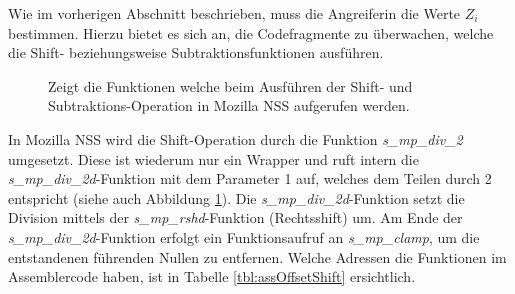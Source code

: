 Wie im vorherigen Abschnitt beschrieben, muss die Angreiferin die Werte $Z_i$ bestimmen.
Hierzu bietet es sich an, die Codefragmente zu überwachen, welche die Shift- beziehungsweise Subtraktionsfunktionen ausführen.

\begin{figure}[h]
\centering
\begin{scaletikzpicturetowidth}{\textwidth}
\end{scaletikzpicturetowidth}
\caption{Zeigt die Funktionen welche beim Ausführen der Shift- und Subtraktions-Operation in Mozilla NSS aufgerufen werden.}
\label{fig:GCDcallstack}
\end{figure}

In Mozilla NSS wird die Shift-Operation durch die Funktion \textit{s_mp_div_2} umgesetzt.
Diese ist wiederum nur ein Wrapper und ruft intern die \textit{s_mp_div_2d}-Funktion mit dem Parameter 1 auf, welches dem Teilen durch 2 entspricht (siehe auch Abbildung \ref{fig:GCDcallstack}).
Die \textit{s_mp_div_2d}-Funktion setzt die Division mittels der \textit{s_mp_rshd}-Funktion (Rechtsshift) um. 
Am Ende der \textit{s_mp_div_2d}-Funktion erfolgt ein Funktionsaufruf an \textit{s_mp_clamp}, um die entstandenen führenden Nullen zu entfernen.
Welche Adressen die Funktionen im Assemblercode haben, ist in Tabelle \ref{tbl:assOffsetShift} ersichtlich. 

